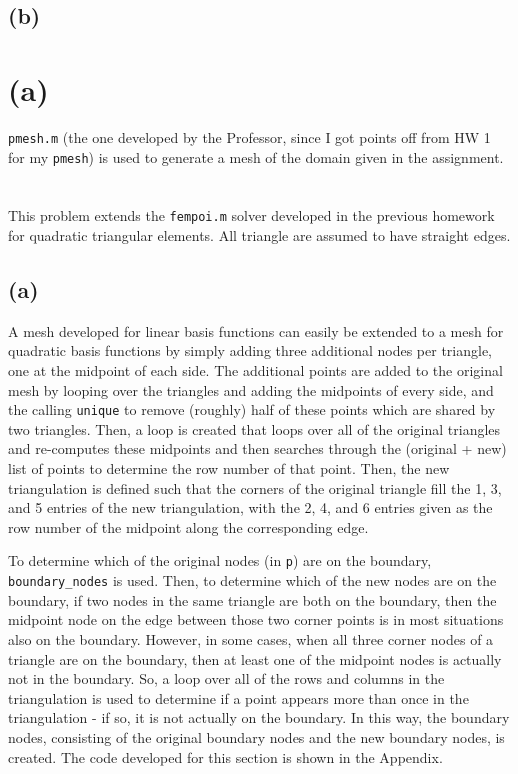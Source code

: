\documentclass[10pt]{article}
\begin{document}
\subsection{(b)}

\section{}

\section{(a)}

{\tt pmesh.m} (the one developed by the Professor, since I got points off from HW 1 for my {\tt pmesh}) is used to generate a mesh of the domain given in the assignment. 

\section{}

This problem extends the {\tt fempoi.m} solver developed in the previous homework for quadratic triangular elements. All triangle are assumed to have straight edges. 

\subsection{(a)}

A mesh developed for linear basis functions can easily be extended to a mesh for quadratic basis functions by simply adding three additional nodes per triangle, one at the midpoint of each side. The additional points are added to the original mesh by looping over the triangles and adding the midpoints of every side, and the calling {\tt unique} to remove (roughly) half of these points which are shared by two triangles. Then, a loop is created that loops over all of the original triangles and re-computes these midpoints and then searches through the (original + new) list of points to determine the row number of that point. Then, the new triangulation is defined such that the corners of the original triangle fill the 1, 3, and 5 entries of the new triangulation, with the 2, 4, and 6 entries given as the row number of the midpoint along the corresponding edge.

To determine which of the original nodes (in {\tt p}) are on the boundary, {\tt boundary\_nodes} is used. Then, to determine which of the new nodes are on the boundary, if two nodes in the same triangle are both on the boundary, then the midpoint node on the edge between those two corner points is in most situations also on the boundary. However, in some cases, when all three corner nodes of a triangle are on the boundary, then at least one of the midpoint nodes is actually not in the boundary. So, a loop over all of the rows and columns in the triangulation is used to determine if a point appears more than once in the triangulation - if so, it is not actually on the boundary. In this way, the boundary nodes, consisting of the original boundary nodes and the new boundary nodes, is created. The code developed for this section is shown in the Appendix.
\end{document}

